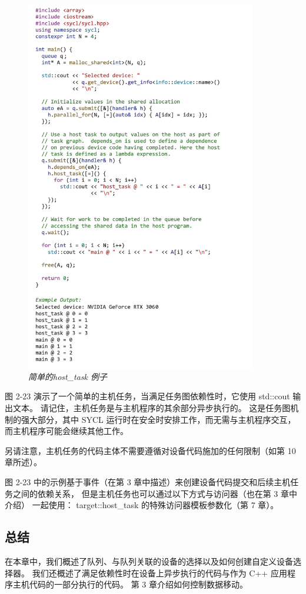 \begin{figure}[H]
	\centering
	\includegraphics[width=0.9\textwidth]{figs/F2.23.png}
	\caption{\textit{简单的host\_task 例子}}
\end{figure}

图 2-23 演示了一个简单的主机任务，当满足任务图依赖性时，它使用 std::cout 输出文本。 
请记住，主机任务是与主机程序的其余部分异步执行的。 
这是任务图机制的强大部分，其中 SYCL 运行时在安全时安排工作，而无需与主机程序交互，而主机程序可能会继续其他工作。

另请注意，主机任务的代码主体不需要遵循对设备代码施加的任何限制（如第 10 章所述）。

图 2-23 中的示例基于事件（在第 3 章中描述）来创建设备代码提交和后续主机任务之间的依赖关系，
但是主机任务也可以通过以下方式与访问器（也在第 3 章中介绍）
一起使用： target::host\_task 的特殊访问器模板参数化（第 7 章）。

\subsection{总结}
在本章中，我们概述了队列、与队列关联的设备的选择以及如何创建自定义设备选择器。 
我们还概述了满足依赖性时在设备上异步执行的代码与作为 C++ 应用程序主机代码的一部分执行的代码。 
第 3 章介绍如何控制数据移动。